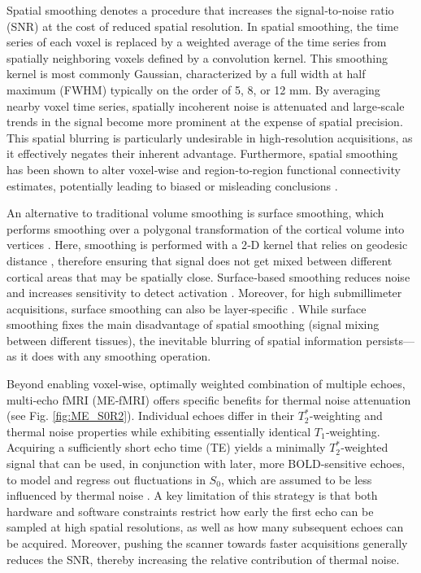 Spatial smoothing denotes a procedure that increases the signal‑to‑noise ratio (SNR) at the cost of reduced spatial resolution. In spatial smoothing, the time series of each voxel is replaced by a weighted average of the time series from spatially neighboring voxels defined by a convolution kernel. This smoothing kernel is most commonly Gaussian, characterized by a full width at half maximum (FWHM) typically on the order of 5, 8, or 12 mm. By averaging nearby voxel time series, spatially incoherent noise is attenuated and large‑scale trends in the signal become more prominent at the expense of spatial precision. This spatial blurring is particularly undesirable in high‑resolution acquisitions, as it effectively negates their inherent advantage. Furthermore, spatial smoothing has been shown to alter voxel‑wise and region‑to‑region functional connectivity estimates, potentially leading to biased or misleading conclusions \citep{alakorkkoEffectsSpatialSmoothing2017, triantafyllouEffectSpatialSmoothing2006}.

    An alternative to traditional volume smoothing is surface smoothing, which performs smoothing over a polygonal transformation of the cortical volume into vertices \citep{fischl2012freesurfer}. Here, smoothing is performed with a 2‑D kernel that relies on geodesic distance \citep{chungCorticalThicknessAnalysis2005}, therefore ensuring that signal does not get mixed between different cortical areas that may be spatially close. Surface‑based smoothing reduces noise and increases sensitivity to detect activation \citep{joSpatialAccuracyFMRI2007, coalsonImpactTraditionalNeuroimaging2018}. Moreover, for high submillimeter acquisitions, surface smoothing can also be layer‑specific \citep{blazejewskaIntracorticalSmoothingSmallvoxel2019}. While surface smoothing fixes the main disadvantage of spatial smoothing (signal mixing between different tissues), the inevitable blurring of spatial information persists—as it does with any smoothing operation.

Beyond enabling voxel‑wise, optimally weighted combination of multiple echoes, multi‑echo fMRI (ME‑fMRI) offers specific benefits for thermal noise attenuation (see Fig. \ref{fig:ME_S0R2}). Individual echoes differ in their $T_2^*$‑weighting and thermal noise properties while exhibiting essentially identical $T_1$‑weighting. Acquiring a sufficiently short echo time (TE) yields a minimally $T_2^*$‑weighted signal that can be used, in conjunction with later, more BOLD‑sensitive echoes, to model and regress out fluctuations in $S_0$, which are assumed to be less influenced by thermal noise \citep{caballero2017methods, talagalaCorrectionSignalDrift1999, brightRemovingMotionPhysiological2013}. A key limitation of this strategy is that both hardware and software constraints restrict how early the first echo can be sampled at high spatial resolutions, as well as how many subsequent echoes can be acquired. Moreover, pushing the scanner towards faster acquisitions generally reduces the SNR, thereby increasing the relative contribution of thermal noise.

